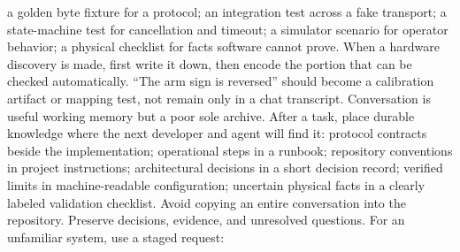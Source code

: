 \markdownRendererUlItem a golden byte fixture for a protocol;\markdownRendererUlItemEnd 
\markdownRendererUlItem an integration test across a fake transport;\markdownRendererUlItemEnd 
\markdownRendererUlItem a state-machine test for cancellation and timeout;\markdownRendererUlItemEnd 
\markdownRendererUlItem a simulator scenario for operator behavior;\markdownRendererUlItemEnd 
\markdownRendererUlItem a physical checklist for facts software cannot prove.\markdownRendererUlItemEnd 
\markdownRendererUlEnd \markdownRendererInterblockSeparator
{}When a hardware discovery is made, first write it down, then encode the portion\markdownRendererSoftLineBreak
{}that can be checked automatically. “The arm sign is reversed” should become a\markdownRendererSoftLineBreak
{}calibration artifact or mapping test, not remain only in a chat transcript.\markdownRendererInterblockSeparator
{}
\markdownRendererSectionEnd \markdownRendererSectionBegin
{}\markdownRendererInterblockSeparator
{}Conversation is useful working memory but a poor sole archive. After a task,\markdownRendererSoftLineBreak
{}place durable knowledge where the next developer and agent will find it:\markdownRendererInterblockSeparator
{}\markdownRendererUlBegin
\markdownRendererUlItem protocol contracts beside the implementation;\markdownRendererUlItemEnd 
\markdownRendererUlItem operational steps in a runbook;\markdownRendererUlItemEnd 
\markdownRendererUlItem repository conventions in project instructions;\markdownRendererUlItemEnd 
\markdownRendererUlItem architectural decisions in a short decision record;\markdownRendererUlItemEnd 
\markdownRendererUlItem verified limits in machine-readable configuration;\markdownRendererUlItemEnd 
\markdownRendererUlItem uncertain physical facts in a clearly labeled validation checklist.\markdownRendererUlItemEnd 
\markdownRendererUlEnd \markdownRendererInterblockSeparator
{}Avoid copying an entire conversation into the repository. Preserve decisions,\markdownRendererSoftLineBreak
{}evidence, and unresolved questions.\markdownRendererInterblockSeparator
{}
\markdownRendererSectionEnd \markdownRendererSectionBegin
{}\markdownRendererInterblockSeparator
{}For an unfamiliar system, use a staged request:\markdownRendererInterblockSeparator
{}\markdownRendererInterblockSeparator
